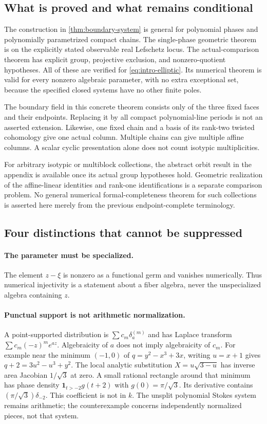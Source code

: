 \documentclass[11pt]{article}
\numberwithin{equation}{section}
\theoremstyle{definition}
\theoremstyle{remark}
\begin{document}
\subsection{What is proved and what remains conditional}
The construction in \cref{thm:boundary-system} is general for polynomial
phases and polynomially parametrized compact chains. The single-phase
geometric theorem is on the explicitly stated observable real Lefschetz
locus. The actual-comparison theorem has explicit group, projective
exclusion, and nonzero-quotient hypotheses. All of these are verified for
\eqref{eq:intro-elliptic}. Its numerical theorem is valid for every
nonzero algebraic parameter, with no extra exceptional set, because the
specified closed systems have no other finite poles.

The boundary field in this concrete theorem consists only of the three
fixed faces and their endpoints. Replacing it by all compact polynomial-line
periods is not an asserted extension. Likewise, one fixed chain and a
basis of its rank-two twisted cohomology give one actual column. Multiple
chains can give multiple affine columns. A scalar cyclic presentation alone
does not count isotypic multiplicities.

For arbitrary isotypic or multiblock collections, the abstract orbit result
in the appendix is available once its actual group hypotheses hold.
Geometric realization of the affine-linear identities and rank-one
identifications is a separate comparison problem. No general numerical
formal-completeness theorem for such collections is asserted here merely
from the previous endpoint-complete terminology.

\subsection{Four distinctions that cannot be suppressed}
\paragraph{The parameter must be specialized.}
The element $z-\xi$ is nonzero as a functional germ and vanishes numerically.
Thus numerical injectivity is a statement about a fiber algebra, never the
unspecialized algebra containing $z$.

\paragraph{Punctual support is not arithmetic normalization.}
A point-supported distribution is $\sum c_m\delta_a^{(m)}$ and has Laplace
transform $\sum c_m(-z)^m e^{az}$. Algebraicity of $a$ does not imply
algebraicity of $c_m$. For example near the minimum $(-1,0)$ of
$q=y^2-x^3+3x$, writing $u=x+1$ gives $q+2=3u^2-u^3+y^2$.
The local analytic substitution $X=u\sqrt{3-u}$ has inverse area Jacobian
$1/\sqrt3$ at zero. A small rational rectangle around that minimum has
phase density $\mathbf1_{t>-2}g(t+2)$ with $g(0)=\pi/\sqrt3$.
Its derivative contains $(\pi/\sqrt3)\delta_{-2}$. This coefficient is not
in $k$. The unsplit polynomial Stokes system remains arithmetic; the
counterexample concerns independently normalized pieces, not that system.
\end{document}
